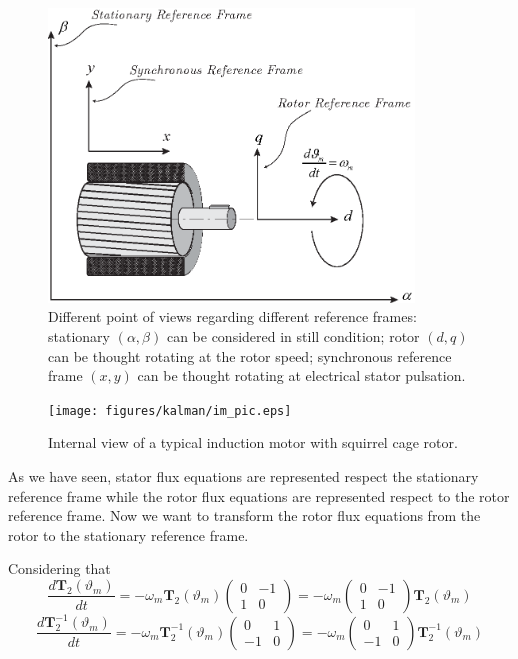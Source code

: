 \documentclass[11pt,a4paper,oneside]{book}
\numberwithin{equation}{section}
\theoremstyle{it}
\theoremstyle{definition}
\begin{document}
\begin{figure}[H]
	\centering
	\includegraphics[width = 275pt, 
	keepaspectratio]{figures/kalman/im_reference_frames_3.eps}
	\captionsetup{width=.5\textwidth}
	\caption{Different point of views regarding different reference frames: 
		stationary $(\alpha,\beta)$ can be considered in still condition; rotor 
		$(d,q)$ can be thought rotating at the rotor speed; synchronous 
		reference 
		frame $(x,y)$ can be thought rotating at electrical stator pulsation.}
	\label{figure_im_ref_frame2} 
\end{figure}
\begin{figure}[H]
	\centering
	\texttt{[image: figures/kalman/im\_pic.eps]}
	\captionsetup{width=.5\textwidth}
	\caption{Internal view of a typical induction motor with squirrel cage 
		rotor.}
	\label{figure_im_machine_view} 
\end{figure}

As we have seen, stator flux equations are represented respect the stationary 
reference frame while the rotor flux equations are represented respect to the 
rotor reference frame. Now we want to transform the rotor flux equations from 
the rotor to the stationary reference frame. 

Considering that
\begin{equation}\label{im_eq_15}
	\frac{d\mathbf{T}_2(\vartheta_m)}{dt}= 
	-\omega_m\mathbf{T}_2(\vartheta_m)\begin{pmatrix} 0 & -1\\ 1 & 0 
	\end{pmatrix} = -\omega_m\begin{pmatrix} 0 & -1\\ 1 & 0 \end{pmatrix} 
	\mathbf{T}_2(\vartheta_m)
\end{equation}
\begin{equation}\label{im_eq_16}
	\frac{d\mathbf{T}_2^{-1}(\vartheta_m)}{dt}= 
	-\omega_m\mathbf{T}_2^{-1}(\vartheta_m)\begin{pmatrix} 0 & 1\\ -1 & 0 
	\end{pmatrix} = -\omega_m\begin{pmatrix} 0 & 1\\ -1 & 0 \end{pmatrix} 
	\mathbf{T}_2^{-1}(\vartheta_m)
\end{equation}
\end{document}
